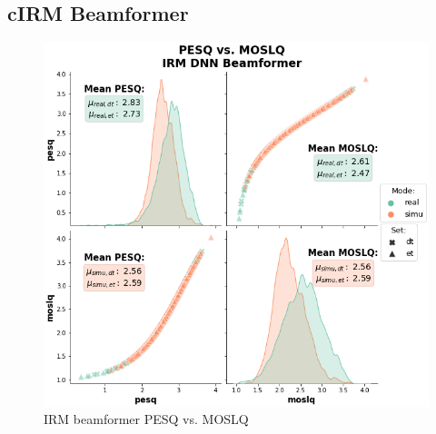\subsection{cIRM Beamformer}
\begin{figure}[H]
    \centering
    \includegraphics[width=\linewidth]{Experiments/images/irm_pesq_mosq}
    \caption{IRM beamformer PESQ vs. MOSLQ}\label{fig:cirm_pesq_mosq}
\end{figure}








